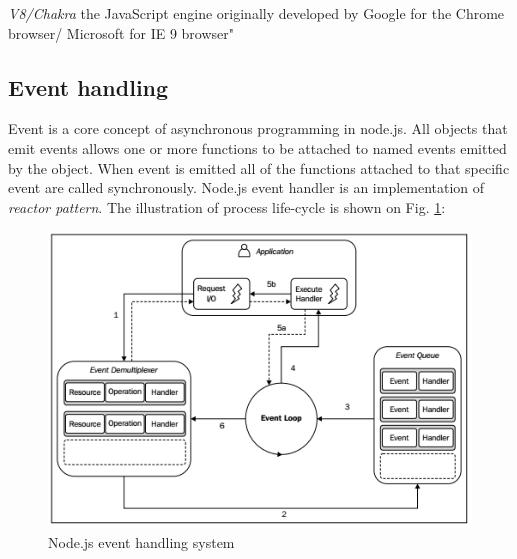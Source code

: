 \textit{V8/Chakra} the JavaScript engine originally developed by Google for the Chrome browser/ Microsoft for IE 9 browser"\cite{nodejsbook} 

\subsection{Event handling}
Event is a core concept of asynchronous programming in node.js. All objects that emit events allows one or more functions to be attached to named events emitted by the object. When event is emitted all of the functions attached to that specific event are called synchronously\cite{events}. Node.js  event handler is an implementation of \textit{reactor pattern}. The illustration of process life-cycle is shown on Fig. \ref{fig:nodeEvent}:

\begin{figure}[ht]
  	\label{fig:nodeEvent}
    \centering
    \includegraphics[width=\textwidth]{grafiken/nodeEventHandling.png}
     \caption{Node.js event handling system \cite{nodejsbook}}
  \end{figure}

